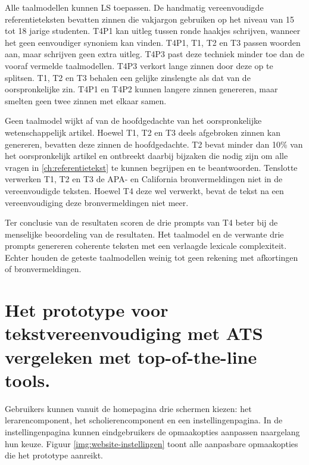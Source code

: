 \medspace

Alle taalmodellen kunnen LS toepassen. De handmatig vereenvoudigde referentieteksten bevatten zinnen die vakjargon gebruiken op het niveau van 15 tot 18 jarige studenten. T4P1 kan uitleg tussen ronde haakjes schrijven, wanneer het geen eenvoudiger synoniem kan vinden. T4P1, T1, T2 en T3 passen woorden aan, maar schrijven geen extra uitleg. T4P3 past deze techniek minder toe dan de vooraf vermelde taalmodellen. T4P3 verkort lange zinnen door deze op te splitsen. T1, T2 en T3 behalen een gelijke zinslengte als dat van de oorspronkelijke zin. T4P1 en T4P2 kunnen langere zinnen genereren, maar smelten geen twee zinnen met elkaar samen. 

\medspace

Geen taalmodel wijkt af van de hoofdgedachte van het oorspronkelijke wetenschappelijk artikel. Hoewel T1, T2 en T3 deels afgebroken zinnen kan genereren, bevatten deze zinnen de hoofdgedachte. T2 bevat minder dan 10\% van het oorspronkelijk artikel en ontbreekt daarbij bijzaken die nodig zijn om alle vragen in \ref{ch:referentietekst} te kunnen begrijpen en te beantwoorden. Tenslotte verwerken T1, T2 en T3 de APA- en California bronvermeldingen niet in de vereenvoudigde teksten. Hoewel T4 deze wel verwerkt, bevat de tekst na een vereenvoudiging deze bronvermeldingen niet meer.

\medspace

Ter conclusie van de resultaten scoren de drie prompts van T4 beter bij de menselijke beoordeling van de resultaten. Het taalmodel en de verwante drie prompts genereren coherente teksten met een verlaagde lexicale complexiteit. Echter houden de geteste taalmodellen weinig tot geen rekening met afkortingen of bronvermeldingen.

\section{Het prototype voor tekstvereenvoudiging met ATS vergeleken met top-of-the-line tools.}


Gebruikers kunnen vanuit de homepagina drie schermen kiezen: het lerarencomponent, het scholierencomponent en een instellingenpagina. In de instellingenpagina kunnen eindgebruikers de opmaakopties aanpassen naargelang hun keuze. Figuur \ref{img:website-instellingen} toont alle aanpasbare opmaakopties die het prototype aanreikt.

